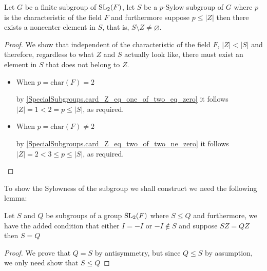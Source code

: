 \begin{footnotesize}
\begin{lemma}
  \label{MaximalAbelianSubgroup.exists_noncenter_of_card_center_lt_card_center_Sylow}
  \leanok
  Let $G$ be a finite subgroup of $\operatorname{SL}_2(F)$, let $S$ be a $p$-Sylow subgroup of $G$ where $p$ is the characteristic of the field $F$ and furthermore suppose $p \le |Z|$ then
  there exists a noncenter element in $S$, that is, $S \setminus Z \ne \varnothing$.
\end{lemma}
\begin{proof}
  \leanok
  We show that independent of the characteristic of the field $F$, $|Z| < |S|$ and therefore, regardless to what $Z$ and $S$ actually look like,
  there must exist an element in $S$ that does not belong to $Z$.

  \begin{itemize}
    \item When $p = \textrm{char}(F) = 2$
    
    by \ref{SpecialSubgroups.card_Z_eq_one_of_two_eq_zero} it follows $|Z| = 1 < 2 = p \leq |S|$, as required.
  
    
    \item When $p = \textrm{char}(F) \ne 2$
    
    by \ref{SpecialSubgroups.card_Z_eq_two_of_two_ne_zero} it follows $|Z| = 2 < 3 \le p \le |S|$, as required.
  \end{itemize}
\end{proof}



To show the Sylowness of the subgroup we shall construct we need the following lemma:

\begin{lemma}
 \label{MaximalAbelianSubgroup.mul_center_inj}
 \leanok
 Let $S$ and $Q$ be subgroups of a group $\operatorname{SL}_2(F)$ where $S \le Q$ and furthermore, we have the added condition that either $I = -I$ or $-I \notin S$ and suppose $SZ = QZ$ then
 $S = Q$
\end{lemma}
\begin{proof}
  \leanok
 We prove that $Q = S$ by antisymmetry, but since $Q \le S$ by assumption, we only need show that $S \le Q$


\end{proof}
\end{footnotesize}
